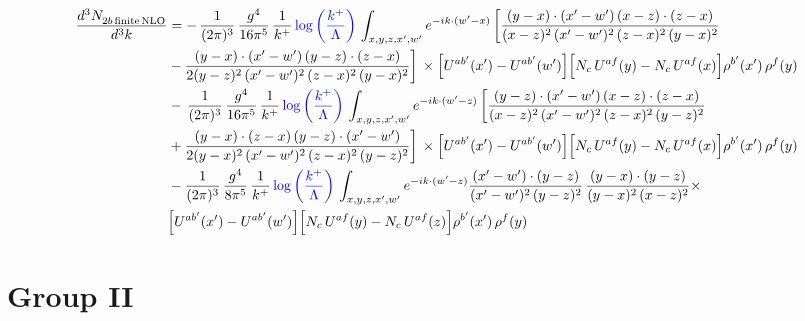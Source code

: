 \documentclass[9pt]{article}
\numberwithin{equation}{section}
\begin{document}
\begin{align}
    \frac{d^{3}N_{2b\,\rm finite\, NLO}^{\rm}}{d^{3}k} & =  -\, \frac{1}{(2\pi)^{3}}\,\frac{g^{4}}{16\pi^{5}}\,\frac{1}{k^{+}}\,{\color{blue}\log{\left(\frac{k^{+}}{\Lambda}\right)}}\,\int_{x,y,z,x',w'}e^{-ik\cdot(w'-x)}\, \bigg[\frac{(y-x)\cdot (x'-w')\,(x-z)\cdot (z-x)}{(x-z)^{2}\,(x'-w')^{2}\,(z-x)^{2}\,(y-x)^{2}}\notag \\ & -\frac{(y-x)\cdot (x'-w')\,(y-z)\cdot (z-x)}{2(y-z)^{2}\,(x'-w')^{2}\,(z-x)^{2}\,(y-x)^{2}}\bigg]\,\times \Big[U^{ab'}(x')-U^{ab'}(w')\Big]\Big[N_{c}\,U^{af}(y)-N_{c}\,U^{af}(x)\Big]\rho^{b'}(x')\,\rho^{f}(y)\notag \\ & -\, \frac{1}{(2\pi)^{3}}\,\frac{g^{4}}{16\pi^{5}}\,\frac{1}{k^{+}}\,{\color{blue}\log{\left(\frac{k^{+}}{\Lambda}\right)}}\,\int_{x,y,z,x',w'}e^{-ik\cdot(w'-z)}\,\bigg[\frac{(y-z)\cdot (x'-w')\,(x-z)\cdot (z-x)}{(x-z)^{2}\,(x'-w')^{2}\,(z-x)^{2}\,(y-z)^{2}}\notag \\ & +\frac{(y-x)\cdot (z-x)\,(y-z)\cdot (x'-w')}{2(y-x)^{2}\,(x'-w')^{2}\,(z-x)^{2}\,(y-z)^{2}}\bigg]\,\times \Big[U^{ab'}(x')-U^{ab'}(w')\Big]\Big[N_{c}\,U^{af}(y)-N_{c}\,U^{af}(x)\Big]\rho^{b'}(x')\,\rho^{f}(y)\notag \\ & - \frac{1}{(2\pi)^{3}}\,\frac{g^{4}}{8\pi^{5}}\,\frac{1}{k^{+}}\,{\color{blue}\log{\left(\frac{k^{+}}{\Lambda}\right)}}\,\int_{x,y,z,x',w'}e^{-ik\cdot(w'-z)} \frac{(x'-w')\cdot(y-z)}{(x'-w')^{2}\,(y-z)^{2}}\,\frac{(y-x)\cdot(y-z)}{(y-x)^{2}\,(x-z)^{2}}\times\notag \\ & \Big[U^{ab'}(x')-U^{ab'}(w')\Big]\Big[N_{c}\,U^{af}(y)-N_{c}\,U^{af}(z)\Big]\rho^{b'}(x')\,\rho^{f}(y)
\end{align}
\section{Group II}
\end{document}
